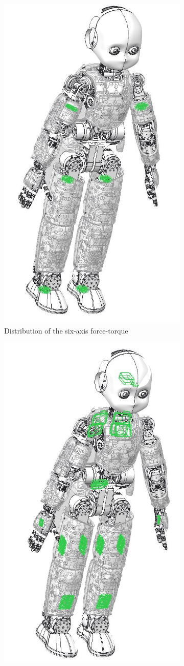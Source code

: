\begin{figure}[tpb]
\centering
    \begin{subfigure}[b]{0.48\textwidth}
        \centering
        \includegraphics[height=\textwidth]{chapter_introduction/figures/icub_ft.png}
        \caption{Distribution of the six-axis force-torque}
        \label{fig:iCubGenova04_ft}
    \end{subfigure}
    \hfill
    \begin{subfigure}[b]{0.48\textwidth}
        \centering
        \includegraphics[height=\textwidth]{chapter_introduction/figures/icub_imu.png}

\end{subfigure}
\end{figure}
